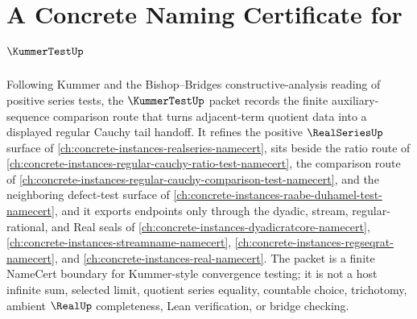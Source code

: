 \chapter{A Concrete Naming Certificate for $\KummerTestUp$}
\label{ch:concrete-instances-kummer-test-namecert}

Following Kummer and the Bishop--Bridges constructive-analysis reading of positive series tests, the $\KummerTestUp$ packet records the finite auxiliary-sequence comparison route that turns adjacent-term quotient data into a displayed regular Cauchy tail handoff. It refines the positive $\RealSeriesUp$ surface of \autoref{ch:concrete-instances-realseries-namecert}, sits beside the ratio route of \autoref{ch:concrete-instances-regular-cauchy-ratio-test-namecert}, the comparison route of \autoref{ch:concrete-instances-regular-cauchy-comparison-test-namecert}, and the neighboring defect-test surface of \autoref{ch:concrete-instances-raabe-duhamel-test-namecert}, and it exports endpoints only through the dyadic, stream, regular-rational, and Real seals of \autoref{ch:concrete-instances-dyadicratcore-namecert}, \autoref{ch:concrete-instances-streamname-namecert}, \autoref{ch:concrete-instances-regseqrat-namecert}, and \autoref{ch:concrete-instances-real-namecert}. The packet is a finite NameCert boundary for Kummer-style convergence testing; it is not a host infinite sum, selected limit, quotient series equality, countable choice, trichotomy, ambient $\RealUp$ completeness, Lean verification, or bridge checking.

